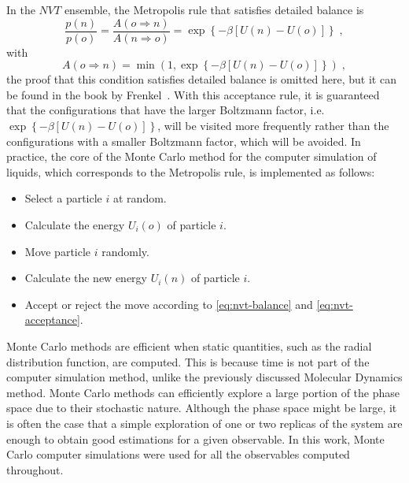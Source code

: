 In the $NVT$ ensemble, the Metropolis rule that satisfies detailed balance is
\begin{equation}
    \frac{p(n)}{p(o)} = \frac{A(o \Longrightarrow n)}{A(n \Longrightarrow o)} =
    \exp{ \left\{ -\beta \left[U(n) - U(o)\right] \right\} }
    \; ,
    \label{eq:nvt-balance}
\end{equation}
with
\begin{equation}
    A(o \Longrightarrow n) = \min{ \left(1, \exp{ \left\{ -\beta \left[U(n) - U(o)\right] \right\} } \right)} 
    \; ,
    \label{eq:nvt-acceptance}
\end{equation}
the proof that this condition satisfies detailed balance is omitted here, but it can
be found in the book by Frenkel~\cite{frenkelUnderstandingMolecularSimulation2001}.
With this acceptance rule, it is guaranteed that the configurations that have the larger
Boltzmann factor, i.e. $\exp{ \left\{ -\beta \left[U(n) - U(o)\right] \right\} }$, 
will be visited more frequently rather than the configurations with a smaller
Boltzmann factor, which will be avoided.
In practice, the core of the Monte Carlo method for the computer simulation of liquids, 
which corresponds to the Metropolis rule, is implemented as follows:
\begin{itemize}
    \item Select a particle $i$ at random.
    \item Calculate the energy $U_{i}(o)$ of particle $i$.
    \item Move particle $i$ randomly.
    \item Calculate the new energy $U_{i}(n)$ of particle $i$.
    \item Accept or reject the move according to \autoref{eq:nvt-balance} and \autoref{eq:nvt-acceptance}.
\end{itemize}
Monte Carlo methods are efficient when static quantities, such as the radial distribution
function, are computed. This is because time is not part of the computer simulation method,
unlike the previously discussed Molecular Dynamics method.
Monte Carlo methods can efficiently explore a large portion of the phase
space due to their stochastic nature. Although the phase space might be large, it is often
the case that a simple exploration of one or two replicas of the system are enough
to obtain good estimations for a given observable. In this work, Monte Carlo computer 
simulations were used for all the observables computed throughout.

